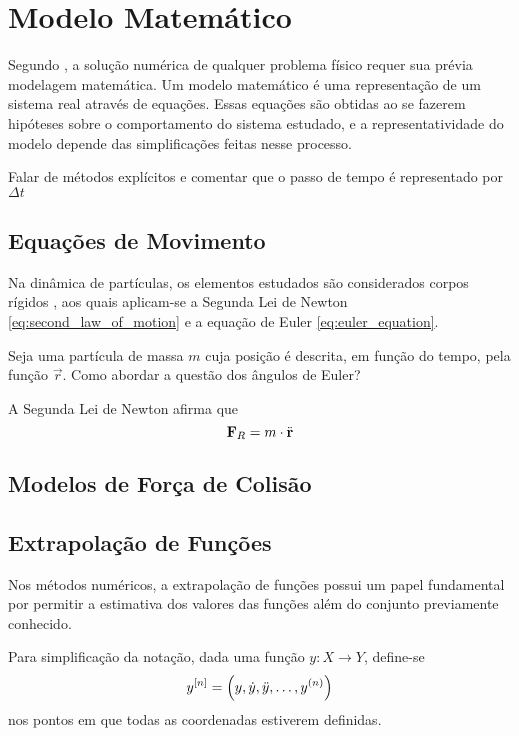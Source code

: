 \chapter{Modelo Matemático}

Segundo , a solução numérica de qualquer problema físico requer sua prévia modelagem matemática. Um modelo matemático é uma representação de um sistema real através de equações. Essas equações são obtidas ao se fazerem hipóteses sobre o comportamento do sistema estudado, e a representatividade do modelo depende das simplificações feitas nesse processo.

\alert{Falar de métodos explícitos e comentar que o passo de tempo é representado por \(\Delta t\)}

\section{Equações de Movimento}

Na dinâmica de partículas, os elementos estudados são considerados corpos rígidos , aos quais aplicam-se a Segunda Lei de Newton \eqref{eq:second_law_of_motion} e a equação de Euler \eqref{eq:euler_equation}.

Seja \particle{} uma partícula de massa \(m\) cuja posição é descrita, em função do tempo, pela função \(\vec{r}\).  \alert{Como abordar a questão dos ângulos de Euler?}

A Segunda Lei de Newton afirma que
\begin{equation} \label{eq:second_law_of_motion}
	\vec{F}_R = m\cdot\deriv{2}{\vec{r}} 
\end{equation}

\section{Modelos de Força de Colisão}

\section{Extrapolação de Funções}
\label{sec:extrapolation}

Nos métodos numéricos, a extrapolação de funções possui um papel fundamental por permitir a estimativa dos valores das funções além do conjunto previamente conhecido.

Para simplificação da notação, dada uma função \(y: X\to Y\), define-se
\[\drvec{n}{y} = \pqty{y, \deriv{1}{y}, \deriv{2}{y}, \dots, \deriv{n}{y}}\]
nos pontos em que todas as coordenadas estiverem definidas.

